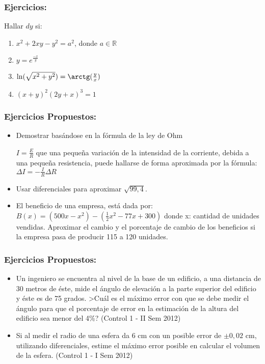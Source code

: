 \documentclass[utf8x]{beamer}
\newcommand{\R}{\mathbb{R}}
\begin{document}
\begin{frame}
\frametitle{Ejercicios:}

Hallar $dy$ si:

\begin{enumerate}
\item
 $x^2+2xy-y^2 = a^2$, donde $a \in \R$

\item
$y=e^{\frac{-x}{y}}$

\item
$\ln (\sqrt{x^2+y^2}) = \arctg (\frac{y}{x})$

\item
$(x+y)^2(2y+x)^3  = 1$

\end{enumerate}

\end{frame}


\begin{frame}
\frametitle{Ejercicios Propuestos:}
\begin{itemize}
\item
Demostrar basándose en la fórmula de la ley de Ohm 

$I=\frac{E}{R}$ 
que una peque\~na variación de la intensidad de la corriente, debida a una peque\~na resistencia, puede hallarse de forma aproximada por la fórmula:
$\Delta I = - \frac{I}{R} \Delta R$

\item
Usar diferenciales para aproximar $\sqrt{99,4}$.

\item
El beneficio de una empresa, está dada por:
$B(x) = (500x-x^2) - (\frac{1}{2}x^2  - 77x  + 300)$
donde x: cantidad de unidades vendidas.
Aproximar el cambio y el porcentaje de cambio de los beneficios si la empresa pasa de producir 115 a 120 unidades.
\end{itemize}
\end{frame}


\begin{frame}
\frametitle{ Ejercicios Propuestos:}
\begin{itemize}
\item
Un ingeniero se encuentra al nivel de la base de un edificio, a una distancia de 30 metros de éste,  mide el ángulo de elevación a la parte superior del edificio y éste es de 75 grados. >Cuál es el máximo error con que se debe medir el ángulo para que el porcentaje de error en la estimación de la altura del edificio sea menor del 4\%? (Control 1 - II Sem 2012)

\item
Si al medir el radio de una esfera da 6 cm con un posible error de 
$\pm 0,02$ cm, utilizando diferenciales, estime el máximo error
 posible en calcular el volumen de la esfera.
 (Control 1 - I Sem 2012)
\end{itemize}
\end{frame}
\end{document}
